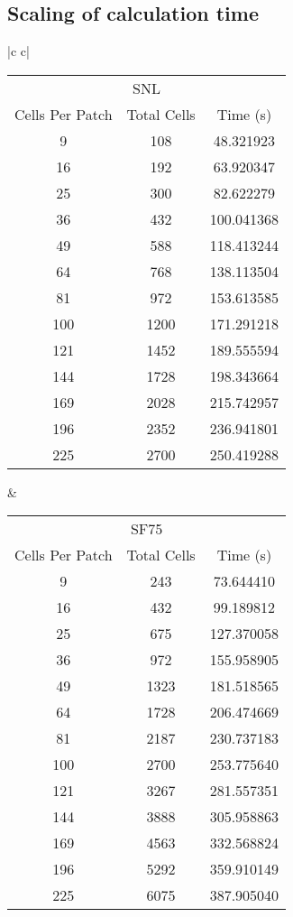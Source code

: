 \subsection{Scaling of calculation time}

\begin{tabular}{|c c|}
    \begin{tabular}{c|c|c|}
        \toprule
        \multicolumn{3}{c|}{SNL}\\
        \cline{1-3}
        {Cells Per Patch} & Total Cells &    Time (s) \\
        \midrule
        9  &       108 &   48.321923 \\
        16  &       192 &   63.920347 \\
        25  &       300 &   82.622279 \\
        36  &       432 &  100.041368 \\
        49  &       588 &  118.413244 \\
        64  &       768 &  138.113504 \\
        81  &       972 &  153.613585 \\
        100  &      1200 &  171.291218 \\
        121  &      1452 &  189.555594 \\
        144  &      1728 &  198.343664 \\
        169 &      2028 &  215.742957 \\
        196 &      2352 &  236.941801 \\
        225 &      2700 &  250.419288 \\
        \bottomrule
    \end{tabular}
    \quad
    &
    \begin{tabular}{|c|c|c}
        \toprule
        \multicolumn{3}{|c}{SF75}\\
        \cline{1-3}
        {Cells Per Patch} & Total Cells &   Time (s) \\
        \midrule
        9  &       243 &   73.644410 \\
        16  &       432 &   99.189812 \\
        25  &       675 &  127.370058 \\
        36  &       972 &  155.958905 \\
        49  &      1323 &  181.518565 \\
        64  &      1728 &  206.474669 \\
        81  &      2187 &  230.737183 \\
        100  &      2700 &  253.775640 \\
        121  &      3267 &  281.557351 \\
        144  &      3888 &  305.958863 \\
        169 &      4563 &  332.568824 \\
        196 &      5292 &  359.910149 \\
        225 &      6075 &  387.905040 \\
        \bottomrule
    \end{tabular}
    \label{benchmark_table_1}
\end{tabular}